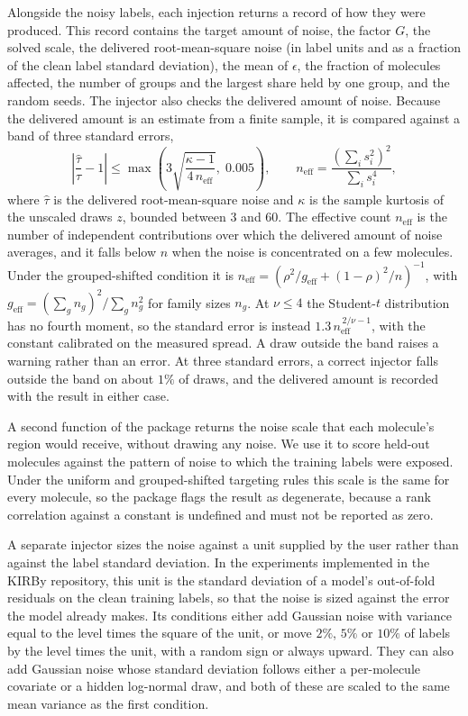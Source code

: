 Alongside the noisy labels, each injection returns a record of how they were produced. This record contains the target amount of noise, the factor
$G$, the solved scale, the delivered root-mean-square noise (in label units and as a fraction of the
clean label standard deviation), the mean of $\epsilon$, the fraction of molecules affected, the
number of groups and the largest share held by one group, and the random seeds. The injector also checks the delivered amount of noise.
Because the delivered amount is an estimate from a finite sample, it is compared against a band of three
standard errors,
\begin{equation}
\left|\frac{\hat{\tau}}{\tau} - 1\right| \le \max\!\left(3\sqrt{\frac{\kappa - 1}{4\,n_{\mathrm{eff}}}},\; 0.005\right),
\qquad
n_{\mathrm{eff}} = \frac{\left(\sum_i s_i^2\right)^2}{\sum_i s_i^4},
\label{eq:dose_tolerance}
\end{equation}
where $\hat{\tau}$ is the delivered root-mean-square noise and $\kappa$ is the sample kurtosis of the
unscaled draws $z$, bounded between 3 and 60. The effective count $n_{\mathrm{eff}}$ is the number of
independent contributions over which the delivered amount of noise averages, and it falls below $n$ when the noise is
concentrated on a few molecules. Under the grouped-shifted condition it is
$n_{\mathrm{eff}} = \left(\rho^2/g_{\mathrm{eff}} + (1-\rho)^2/n\right)^{-1}$, with
$g_{\mathrm{eff}} = \left(\sum_g n_g\right)^2 / \sum_g n_g^2$ for family sizes $n_g$. At
$\nu \le 4$ the Student-$t$ distribution has no fourth moment, so the standard error is instead
$1.3\,n_{\mathrm{eff}}^{\,2/\nu - 1}$, with the constant calibrated on the measured spread. A draw
outside the band raises a warning rather than an error. At three standard errors, a correct injector
falls outside the band on about $1\%$ of draws, and the delivered amount is recorded with the result
in either case.

A second function of the package returns the noise scale that each molecule's region would receive, without drawing any noise.
We use it to score held-out molecules against the pattern of noise to which the training labels were exposed. Under the
uniform and grouped-shifted targeting rules this scale is the same for every molecule, so the package flags the result
as degenerate, because a rank correlation against a constant is undefined and must not be reported as zero.

A separate injector sizes the noise against a unit supplied by the user rather than against the label standard
deviation. In the experiments implemented in the KIRBy repository, this unit is the standard deviation of a model's out-of-fold residuals on
the clean training labels, so that the noise is sized against the error the model already makes. Its
conditions either add Gaussian noise with variance equal to the level times the square of the unit, or move $2\%$,
$5\%$ or $10\%$ of labels by the level times the unit, with a random sign or always upward. They can also add
Gaussian noise whose standard deviation follows either a per-molecule covariate or a hidden
log-normal draw, and both of these are scaled to the same mean variance as the first condition.

